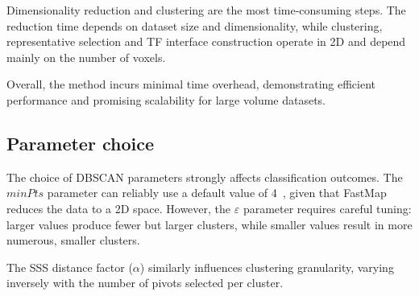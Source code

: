 Dimensionality reduction and clustering are the most time-consuming steps. The reduction time depends on dataset size and dimensionality, while clustering, representative selection and TF interface construction operate in 2D and depend mainly on the number of voxels.


Overall, the method incurs minimal time overhead, demonstrating efficient performance and promising scalability for large volume datasets.

\subsection{Parameter choice}
\label{subsect:parameter-choice}

The choice of DBSCAN parameters strongly affects classification outcomes. The $minPts$ parameter can reliably use a default value of 4~\cite{ester1996}, given that FastMap reduces the data to a 2D space. However, the $\varepsilon$ parameter requires careful tuning: larger values produce fewer but larger clusters, while smaller values result in more numerous, smaller clusters.

The SSS distance factor ($\alpha$) similarly influences clustering granularity, varying inversely with the number of pivots selected per cluster.

